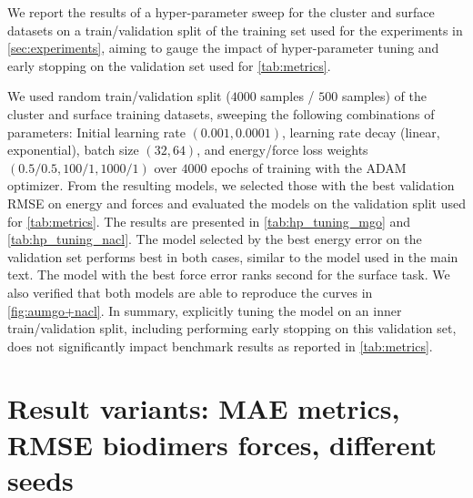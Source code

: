 \documentclass[10pt]{article}
\begin{document}
We report the results of a hyper-parameter sweep for  the  cluster and  surface datasets on a  train/validation split of the training set used for the experiments in \cref{sec:experiments}, aiming to gauge the impact of hyper-parameter tuning and early stopping on the validation set used for \cref{tab:metrics}.

We used random train/validation split ($4000$ samples / $500$ samples) of the  cluster and  surface training datasets, sweeping the following combinations of parameters: Initial learning rate $(0.001, 0.0001)$, learning rate decay (linear, exponential), batch size $(32, 64)$, and energy/force loss weights $(0.5/0.5, 100/1, 1000/1)$ over $4000$ epochs of training with the ADAM optimizer.
From the resulting models, we selected those with the best  validation RMSE on energy and forces and evaluated the models on the  validation split used for \cref{tab:metrics}.
The results  are presented in \cref{tab:hp_tuning_mgo} and \cref{tab:hp_tuning_nacl}.
The model selected by the best energy error on the validation set performs best in both cases, similar to the model used in the main text. The model with the best force error ranks second for the  surface task. We also verified that both models are able to reproduce the curves in \cref{fig:aumgo+nacl}.
In summary, explicitly tuning the model on an inner train/validation split, including performing early stopping on this validation set, does not significantly impact benchmark results as reported in \cref{tab:metrics}.

\begin{table}[h]
    \caption{Errors on the validation set for the hyperparameter set with the best inner validation metrics for the  task.}
    \centering
    
    \label{tab:hp_tuning_mgo}
\end{table}

\begin{table}[h]
    \caption{Errors on the validation set for the hyperparameter set with the best inner validation metrics for the  task.}
    \centering
    
    \label{tab:hp_tuning_nacl}
\end{table}

\clearpage
\section{Result variants: MAE metrics, RMSE biodimers forces, different seeds}
\label{sec:apx-mae-rmse}
\end{document}
